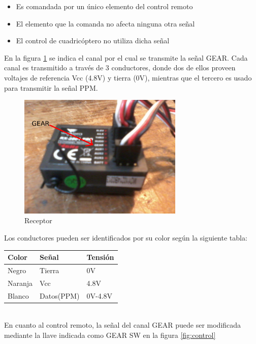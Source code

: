 \documentclass[main]{subfiles}
\begin{document}
\begin{itemize}
\item Es comandada por un único elemento del control remoto
\item El elemento que la comanda no afecta ninguna otra señal
\item El control de cuadricóptero no utiliza dicha señal
\end{itemize}

En la figura \ref{fig:receptor} se indica el canal por el cual se transmite la señal GEAR. Cada canal es transmitido a través de 3 conductores, donde dos de ellos proveen voltajes de referencia Vcc (4.8V) y tierra (0V), mientras que el tercero es usado para transmitir la señal PPM.\\

\begin{figure}[H]
\begin{center}
\includegraphics[width=0.7\textwidth]{./pics_switcheo/receptor.png}
\caption{Receptor}
\label{fig:receptor}
\end{center}
\end{figure}

Los conductores pueden ser identificados por su color según la siguiente tabla:\\

\begin{tabular}{|l|l|l|}
\hline
Color 		& Señal			&Tensión	\\
\hline
Negro		& Tierra		& 0V		\\
\hline
Naranja 	& Vcc			& 4.8V 		\\
\hline
Blanco 		& Datos(PPM) 	& 0V-4.8V 	\\
\hline
\end{tabular}
\\

En cuanto al control remoto, la señal del canal GEAR puede ser modificada mediante la llave indicada como GEAR SW en la figura \ref{fig:control}
\end{document}
